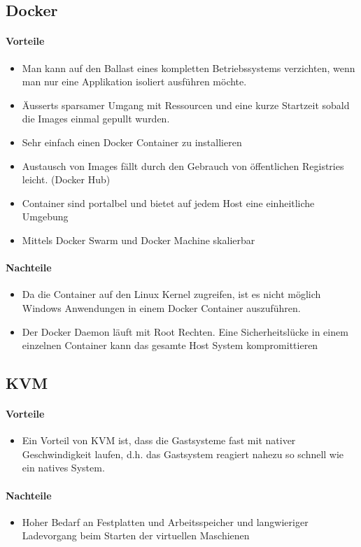 \pagebreak


\subsection{Docker}
\paragraph{Vorteile}
\begin{itemize}
	\item Man kann auf den Ballast eines kompletten Betriebssystems verzichten, wenn man nur eine Applikation isoliert ausführen möchte.
	\item Äusserts sparsamer Umgang mit Ressourcen und eine kurze Startzeit	sobald die Images einmal gepullt wurden.
	\item Sehr einfach einen Docker Container zu installieren
	\item Austausch von Images fällt durch den Gebrauch von öffentlichen Registries leicht. (Docker Hub)
	\item Container sind portalbel und bietet auf jedem Host eine einheitliche Umgebung
	\item Mittels Docker Swarm und Docker Machine skalierbar
\end{itemize}
\paragraph{Nachteile}
\begin{itemize}
	\item Da die Container auf den Linux Kernel zugreifen, ist es nicht möglich Windows Anwendungen in einem Docker Container auszuführen.
	\item Der Docker Daemon läuft mit Root Rechten. Eine Sicherheitslücke in einem einzelnen Container kann das gesamte Host System kompromittieren
\end{itemize}

\subsection{KVM} %
\paragraph{Vorteile}
\begin{itemize}
	\item Ein Vorteil von KVM ist, dass die Gastsysteme fast mit nativer Geschwindigkeit laufen, d.h. das Gastsystem reagiert nahezu so schnell wie ein natives System. 
\end{itemize}
\paragraph{Nachteile}
\begin{itemize}
	\item Hoher Bedarf an Festplatten und Arbeitsspeicher und langwieriger Ladevorgang beim Starten der virtuellen Maschienen
\end{itemize}


